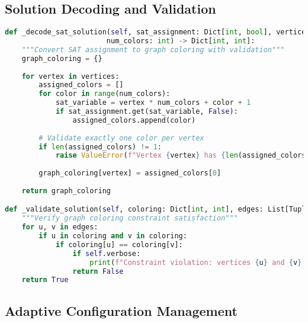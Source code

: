 \subsection{Solution Decoding and Validation}
\label{appendix:solution-decoding}

\begin{lstlisting}[language=Python, caption=Solution Decoding and Validation]
def _decode_sat_solution(self, sat_assignment: Dict[int, bool], vertices: List[int], 
                        num_colors: int) -> Dict[int, int]:
    """Convert SAT assignment to graph coloring with validation"""
    graph_coloring = {}
    
    for vertex in vertices:
        assigned_colors = []
        for color in range(num_colors):
            sat_variable = vertex * num_colors + color + 1
            if sat_assignment.get(sat_variable, False):
                assigned_colors.append(color)
        
        # Validate exactly one color per vertex
        if len(assigned_colors) != 1:
            raise ValueError(f"Vertex {vertex} has {len(assigned_colors)} colors assigned")
        
        graph_coloring[vertex] = assigned_colors[0]
    
    return graph_coloring

def _validate_solution(self, coloring: Dict[int, int], edges: List[Tuple[int, int]]) -> bool:
    """Verify graph coloring constraint satisfaction"""
    for u, v in edges:
        if u in coloring and v in coloring:
            if coloring[u] == coloring[v]:
                if self.verbose:
                    print(f"Constraint violation: vertices {u} and {v} have same color {coloring[u]}")
                return False
    return True
\end{lstlisting}

\subsection{Adaptive Configuration Management}
\label{appendix:config-management}

